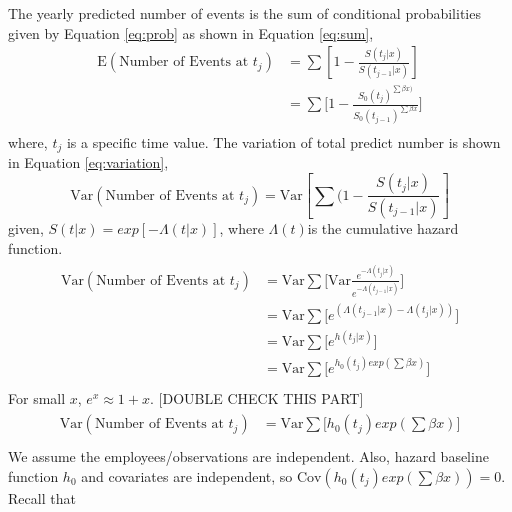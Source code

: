 \documentclass[12pt,letterpaper]{article}
\begin{document}
The yearly predicted number of events is the sum of conditional probabilities given by Equation \ref{eq:prob} as shown in Equation \ref{eq:sum},
 \begin{equation}
 \label{eq:sum}
 \begin{split}
 \mathrm{E}(\text{Number of Events at } t_j)&=\sum{[1-\frac{S(t_j|x)}{S(t_{j-1}|x)}]}\\
 &=\sum{\big[1-\frac{{S_0(t_j)}^{\sum\beta x)}}{   {S_0(t_{j-1})}^{\sum\beta x}}\big]}\\
 \end{split}
 \end{equation}
where,  $t_j$ is a specific time value. 
The variation of total predict number is shown in Equation \ref{eq:variation},
\begin{equation}
\mathrm{Var}(\text{Number of Events at } t_j) =\mathrm{Var}[\sum{(1-\frac{S(t_j|x)}{S(t_{j-1}|x)}}]
\end{equation}
given, $S(t|x)=exp[-\Lambda(t|x)] $, where $\Lambda(t)$is the cumulative hazard function. 
\begin{align*}
\begin{split}
\mathrm{Var}(\text{Number of Events at } t_j) 
&=\mathrm{Var}\sum{\big[\mathrm{Var}\frac{e^{-\Lambda (t_j|x)}}{e^{-\Lambda (t_{j-1}|x)}}\big]}		\\
&=\mathrm{Var}\sum{\big[{e^{(\Lambda (t_{j-1}|x)-\Lambda (t_j|x))}}\big]}		\\
&=\mathrm{Var}\sum{\big[{e^{h(t_j|x)}}\big]}		\\
&=\mathrm{Var}\sum{\big[{e^{h_0(t_j)exp(\sum{\beta x})}}\big]}		\\
\end{split}
\end{align*}
For small $x$, $e^{x}\approx 1+x$. [DOUBLE CHECK THIS PART]
\begin{align*}
\begin{split}
\mathrm{Var}(\text{Number of Events at } t_j) 
&=\mathrm{Var}\sum{\big[h_0(t_j)exp(\sum{\beta x})\big]}		\\
\end{split}
\end{align*}
We assume the employees/observations are independent. Also, hazard baseline function $h_0$ and covariates are independent, so $\mathrm{Cov}(h_0(t_j)exp(\sum{\beta x}))=0$. Recall that
\end{document}
